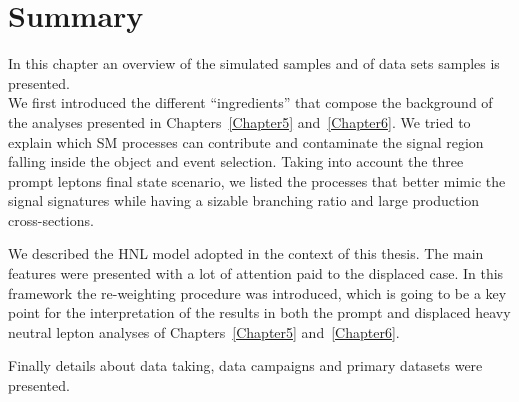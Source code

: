 \section{Summary}\label{sec:summaryC4}
In this chapter an overview of the simulated samples and of data sets
samples is presented.\\
We first introduced the different ``ingredients'' that compose the
background of the analyses presented in Chapters~\ref{Chapter5}
and~\ref{Chapter6}. We tried to explain which SM processes can
contribute and contaminate the signal region falling inside the object and event
selection.  Taking into account the three prompt
leptons final state scenario, we listed the processes that better
mimic the signal signatures while having a sizable branching
ratio and large production cross-sections. 

We described the HNL model adopted in the context of this thesis. The
main features were presented with a lot of attention paid to the
displaced case. In this framework the re-weighting procedure was
introduced, which is going to be a key point for the 
interpretation of the results in both the prompt and displaced heavy neutral lepton
analyses of Chapters~\ref{Chapter5}
and~\ref{Chapter6}.

Finally details about data taking, data campaigns and primary datasets were presented.


